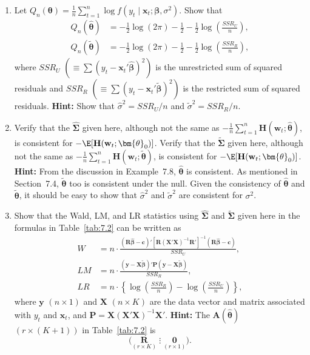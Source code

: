 \begin{problemset}
\begin{enumerate}[label=(\alph*)]
\item Let $Q_n(\bm{\theta}) = \frac{1}{n}\sum_{t=1}^{n}\log f(y_t \mid \mathbf{x}_t; \bm{\beta}, \sigma^2)$. Show that
\begin{align*}
Q_n(\hat{\bm{\theta}}) &= -\frac{1}{2}\log(2\pi) - \frac{1}{2} - \frac{1}{2}\log\!\left(\frac{SSR_U}{n}\right), \\
Q_n(\tilde{\bm{\theta}}) &= -\frac{1}{2}\log(2\pi) - \frac{1}{2} - \frac{1}{2}\log\!\left(\frac{SSR_R}{n}\right),
\end{align*}
where $SSR_U$ $(\equiv \sum(y_t - \mathbf{x}_t'\hat{\bm{\beta}})^2)$ is the unrestricted sum of squared residuals and $SSR_R$ $(\equiv \sum(y_t - \mathbf{x}_t'\tilde{\bm{\beta}})^2)$ is the restricted sum of squared residuals. \textbf{Hint:} Show that $\hat{\sigma}^2 = SSR_U/n$ and $\tilde{\sigma}^2 = SSR_R/n$.

\item Verify that the $\hat{\bm{\Sigma}}$ given here, although not the same as $-\frac{1}{n}\sum_{t=1}^{n}\mathbf{H}(\mathbf{w}_t; \hat{\bm{\theta}})$, is consistent for $-\E[\mathbf{H}(\mathbf{w}_t; \bm{\theta}_0)]$. Verify that the $\tilde{\bm{\Sigma}}$ given here, although not the same as $-\frac{1}{n}\sum_{t=1}^{n}\mathbf{H}(\mathbf{w}_t; \tilde{\bm{\theta}})$, is consistent for $-\E[\mathbf{H}(\mathbf{w}_t; \bm{\theta}_0)]$. \textbf{Hint:} From the discussion in Example~7.8, $\hat{\bm{\theta}}$ is consistent. As mentioned in Section~7.4, $\tilde{\bm{\theta}}$ too is consistent under the null. Given the consistency of $\hat{\bm{\theta}}$ and $\tilde{\bm{\theta}}$, it should be easy to show that $\hat{\sigma}^2$ and $\tilde{\sigma}^2$ are consistent for $\sigma^2$.

\item Show that the Wald, LM, and LR statistics using $\hat{\bm{\Sigma}}$ and $\tilde{\bm{\Sigma}}$ given here in the formulas in Table~\ref{tab:7.2} can be written as
\begin{align*}
W &= n \cdot \frac{(\mathbf{R}\hat{\bm{\beta}} - \mathbf{c})'[\mathbf{R}(\mathbf{X}'\mathbf{X})^{-1}\mathbf{R}']^{-1}(\mathbf{R}\hat{\bm{\beta}} - \mathbf{c})}{SSR_U}, \\[4pt]
LM &= n \cdot \frac{(\mathbf{y} - \mathbf{X}\tilde{\bm{\beta}})'\mathbf{P}(\mathbf{y} - \mathbf{X}\tilde{\bm{\beta}})}{SSR_R}, \\[4pt]
LR &= n \cdot \left\{\log\!\left(\frac{SSR_R}{n}\right) - \log\!\left(\frac{SSR_U}{n}\right)\right\},
\end{align*}
where $\mathbf{y}$ $(n \times 1)$ and $\mathbf{X}$ $(n \times K)$ are the data vector and matrix associated with $y_t$ and $\mathbf{x}_t$, and $\mathbf{P} = \mathbf{X}(\mathbf{X}'\mathbf{X})^{-1}\mathbf{X}'$. \textbf{Hint:} The $\mathbf{A}(\hat{\bm{\theta}})$ $(r \times (K+1))$ in Table~\ref{tab:7.2} is
\[
\bigl(\underset{(r \times K)}{\mathbf{R}} \;\vdots\; \underset{(r \times 1)}{\mathbf{0}}\bigr).
\]


\end{enumerate}
\end{problemset}
